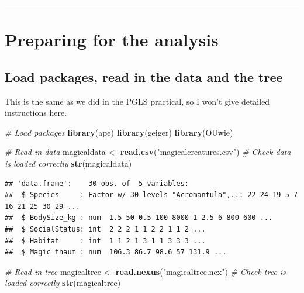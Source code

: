 \documentclass[]{book}
\newenvironment{Shaded}{\begin{snugshade}}{\end{snugshade}}
\newcommand{\KeywordTok}[1]{\textcolor[rgb]{0.13,0.29,0.53}{\textbf{{#1}}}}
\newcommand{\StringTok}[1]{\textcolor[rgb]{0.31,0.60,0.02}{{#1}}}
\newcommand{\CommentTok}[1]{\textcolor[rgb]{0.56,0.35,0.01}{\textit{{#1}}}}
\newcommand{\NormalTok}[1]{{#1}}
\begin{document}
\begin{center}\rule{0.5\linewidth}{\linethickness}\end{center}

\section{Preparing for the analysis}\label{preparing-for-the-analysis-1}

\subsection{Load packages, read in the data and the
tree}\label{load-packages-read-in-the-data-and-the-tree}

This is the same as we did in the PGLS practical, so I won't give
detailed instructions here.

\begin{Shaded}
\begin{Highlighting}[]
\CommentTok{# Load packages}
\KeywordTok{library}\NormalTok{(ape)}
\KeywordTok{library}\NormalTok{(geiger)}
\KeywordTok{library}\NormalTok{(OUwie)}
\end{Highlighting}
\end{Shaded}

\begin{Shaded}
\begin{Highlighting}[]
\CommentTok{# Read in data}
\NormalTok{magicaldata <-}\StringTok{ }\KeywordTok{read.csv}\NormalTok{(}\StringTok{"magicalcreatures.csv"}\NormalTok{)}
\CommentTok{# Check data is loaded correctly}
\KeywordTok{str}\NormalTok{(magicaldata)}
\end{Highlighting}
\end{Shaded}

\begin{verbatim}
## 'data.frame':    30 obs. of  5 variables:
##  $ Species     : Factor w/ 30 levels "Acromantula",..: 22 24 19 5 7 16 21 25 30 29 ...
##  $ BodySize_kg : num  1.5 50 0.5 100 8000 1 2.5 6 800 600 ...
##  $ SocialStatus: int  2 2 2 1 1 2 2 1 1 2 ...
##  $ Habitat     : int  1 1 2 1 3 1 1 3 3 3 ...
##  $ Magic_thaum : num  106.3 86.7 98.6 57 131.9 ...
\end{verbatim}

\begin{Shaded}
\begin{Highlighting}[]
\CommentTok{# Read in tree}
\NormalTok{magicaltree <-}\StringTok{ }\KeywordTok{read.nexus}\NormalTok{(}\StringTok{"magicaltree.nex"}\NormalTok{) }
\CommentTok{# Check tree is loaded correctly}
\KeywordTok{str}\NormalTok{(magicaltree)}
\end{Highlighting}
\end{Shaded}
\end{document}

